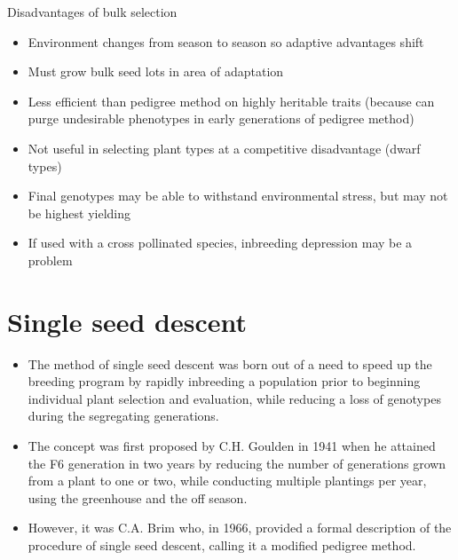 \documentclass[11pt,ignorenonframetext,aspectratio=169]{beamer}
\providecommand{\tightlist}{%
  \setlength{\itemsep}{0pt}\setlength{\parskip}{0pt}}
\begin{document}
\begin{frame}{Disadvantages of bulk selection}
\protect\hypertarget{disadvantages-of-bulk-selection}{}
\begin{itemize}
\tightlist
\item
  Environment changes from season to season so adaptive advantages shift
\item
  Must grow bulk seed lots in area of adaptation
\item
  Less efficient than pedigree method on highly heritable traits
  (because can purge undesirable phenotypes in early generations of
  pedigree method)
\item
  Not useful in selecting plant types at a competitive disadvantage
  (dwarf types)
\item
  Final genotypes may be able to withstand environmental stress, but may
  not be highest yielding
\item
  If used with a cross pollinated species, inbreeding depression may be
  a problem
\end{itemize}
\end{frame}

\hypertarget{single-seed-descent}{%
\section{Single seed descent}\label{single-seed-descent}}

\begin{frame}{}
\protect\hypertarget{section-14}{}
\begin{itemize}
\tightlist
\item
  The method of single seed descent was born out of a need to speed up
  the breeding program by rapidly inbreeding a population prior to
  beginning individual plant selection and evaluation, while reducing a
  loss of genotypes during the segregating generations.
\item
  The concept was first proposed by C.H. Goulden in 1941 when he
  attained the F6 generation in two years by reducing the number of
  generations grown from a plant to one or two, while conducting
  multiple plantings per year, using the greenhouse and the off season.
\item
  However, it was C.A. Brim who, in 1966, provided a formal description
  of the procedure of single seed descent, calling it a modified
  pedigree method.
\end{itemize}
\end{frame}
\end{document}
